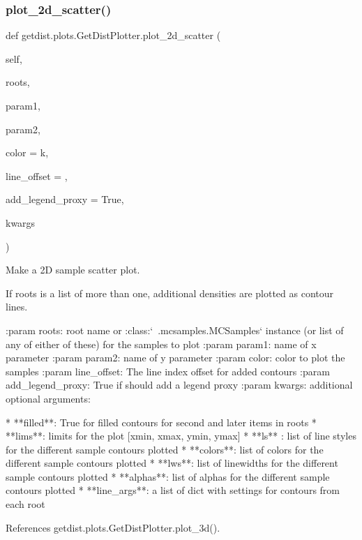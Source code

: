 \subsubsection{\texorpdfstring{plot\+\_\+2d\+\_\+scatter()}{plot\_2d\_scatter()}}
{\footnotesize\ttfamily def getdist.\+plots.\+Get\+Dist\+Plotter.\+plot\+\_\+2d\+\_\+scatter (\begin{DoxyParamCaption}\item[{}]{self,  }\item[{}]{roots,  }\item[{}]{param1,  }\item[{}]{param2,  }\item[{}]{color = {\ttfamily \textquotesingle{}k\textquotesingle{}},  }\item[{}]{line\+\_\+offset = {},  }\item[{}]{add\+\_\+legend\+\_\+proxy = {\ttfamily True},  }\item[{}]{kwargs }\end{DoxyParamCaption})}

\begin{DoxyVerb}Make a 2D sample scatter plot.

If roots is a list of more than one, additional densities are plotted as contour lines. 

:param roots: root name or :class:`~.mcsamples.MCSamples` instance (or list of any of either of these) for the samples to plot
:param param1: name of x parameter
:param param2: name of y parameter
:param color: color to plot the samples
:param line_offset: The line index offset for added contours
:param add_legend_proxy: True if should add a legend proxy
:param kwargs: additional optional arguments:

* **filled**: True for filled contours for second and later items in roots
* **lims**: limits for the plot [xmin, xmax, ymin, ymax]
* **ls** : list of line styles for the different sample contours plotted 
* **colors**: list of colors for the different sample contours plotted 
* **lws**: list of linewidths for the different sample contours plotted
* **alphas**: list of alphas for the different sample contours plotted 
* **line_args**: a list of dict with settings for contours from each root
\end{DoxyVerb}
 

References getdist.\+plots.\+Get\+Dist\+Plotter.\+plot\+\_\+3d().


